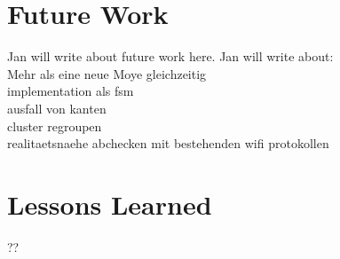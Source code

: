 \section{Future Work} \label{sec:fut}
Jan will write about future work here.
Jan will write about:\\
Mehr als eine neue Moye gleichzeitig\\
implementation als fsm\\
ausfall von kanten\\
cluster regroupen\\
realitaetsnaehe abchecken mit bestehenden wifi protokollen\\

\section{Lessons Learned} \label{sec:les}
??
